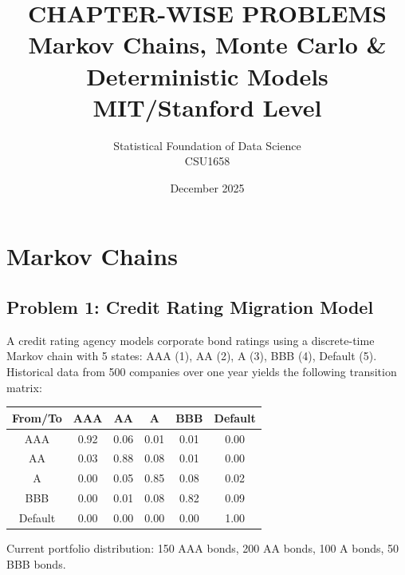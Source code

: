 \documentclass[12pt]{article}
\title{CHAPTER-WISE PROBLEMS\\
\large Markov Chains, Monte Carlo \& Deterministic Models\\
\small MIT/Stanford Level}
\author{Statistical Foundation of Data Science\\
CSU1658}
\date{December 2025}
\begin{document}
\maketitle

\tableofcontents
\newpage


\section{Markov Chains}

\subsection*{Problem 1: Credit Rating Migration Model}

A credit rating agency models corporate bond ratings using a discrete-time Markov chain with 5 states: AAA (1), AA (2), A (3), BBB (4), Default (5). Historical data from 500 companies over one year yields the following transition matrix:

\begin{center}
\begin{tabular}{cccccc}
\toprule
From/To & AAA & AA & A & BBB & Default \\
\midrule
AAA & 0.92 & 0.06 & 0.01 & 0.01 & 0.00 \\
AA & 0.03 & 0.88 & 0.08 & 0.01 & 0.00 \\
A & 0.00 & 0.05 & 0.85 & 0.08 & 0.02 \\
BBB & 0.00 & 0.01 & 0.08 & 0.82 & 0.09 \\
Default & 0.00 & 0.00 & 0.00 & 0.00 & 1.00 \\
\bottomrule
\end{tabular}
\end{center}

Current portfolio distribution: 150 AAA bonds, 200 AA bonds, 100 A bonds, 50 BBB bonds.
\end{document}
